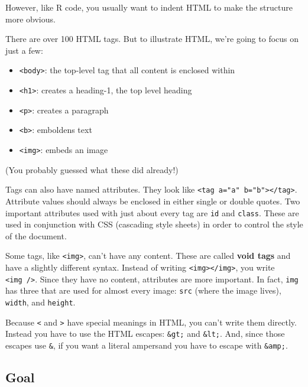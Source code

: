 However, like R code, you usually want to indent HTML to make the
structure more obvious.

There are over 100 HTML tags. But to illustrate HTML, we're going to
focus on just a few:

\begin{itemize}
\tightlist
\item
  \texttt{\textless{}body\textgreater{}}: the top-level tag that all
  content is enclosed within
\item
  \texttt{\textless{}h1\textgreater{}}: creates a heading-1, the top
  level heading
\item
  \texttt{\textless{}p\textgreater{}}: creates a paragraph
\item
  \texttt{\textless{}b\textgreater{}}: emboldens text
\item
  \texttt{\textless{}img\textgreater{}}: embeds an image
\end{itemize}

(You probably guessed what these did already!)

Tags can also have named attributes. They look like
\texttt{\textless{}tag\ a="a"\ b="b"\textgreater{}\textless{}/tag\textgreater{}}.
Attribute values should always be enclosed in either single or double
quotes. Two important attributes used with just about every tag are
\texttt{id} and \texttt{class}. These are used in conjunction with CSS
(cascading style sheets) in order to control the style of the document.

Some tags, like \texttt{\textless{}img\textgreater{}}, can't have any
content. These are called \textbf{void tags} and have a slightly
different syntax. Instead of writing
\texttt{\textless{}img\textgreater{}\textless{}/img\textgreater{}}, you
write \texttt{\textless{}img\ /\textgreater{}}. Since they have no
content, attributes are more important. In fact, \texttt{img} has three
that are used for almost every image: \texttt{src} (where the image
lives), \texttt{width}, and \texttt{height}.

Because \texttt{\textless{}} and \texttt{\textgreater{}} have special
meanings in HTML, you can't write them directly. Instead you have to use
the HTML escapes: \texttt{\&gt;} and \texttt{\&lt;}. And, since those
escapes use \texttt{\&}, if you want a literal ampersand you have to
escape with \texttt{\&amp;}.

\hypertarget{goal}{%
\subsection{Goal}\label{goal}}

